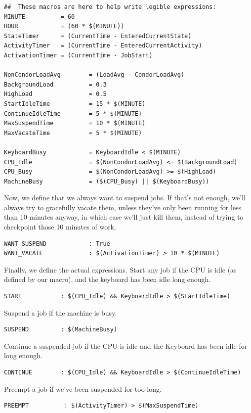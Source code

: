 \begin{verbatim}
##  These macros are here to help write legible expressions:
MINUTE          = 60
HOUR            = (60 * $(MINUTE))
StateTimer      = (CurrentTime - EnteredCurrentState)
ActivityTimer   = (CurrentTime - EnteredCurrentActivity)
ActivationTimer = (CurrentTime - JobStart)

NonCondorLoadAvg        = (LoadAvg - CondorLoadAvg)
BackgroundLoad          = 0.3
HighLoad                = 0.5
StartIdleTime           = 15 * $(MINUTE)
ContinueIdleTime        = 5 * $(MINUTE)
MaxSuspendTime          = 10 * $(MINUTE)
MaxVacateTime           = 5 * $(MINUTE)

KeyboardBusy            = KeyboardIdle < $(MINUTE)
CPU_Idle                = $(NonCondorLoadAvg) <= $(BackgroundLoad)
CPU_Busy                = $(NonCondorLoadAvg) >= $(HighLoad)
MachineBusy             = ($(CPU_Busy) || $(KeyboardBusy))
\end{verbatim}

Now, we define that we always want to suspend jobs.
If that's not enough, we'll always try to gracefully vacate them,
unless they've only been running for less than 10 minutes anyway, in
which case we'll just kill them, instead of trying to checkpoint those
10 minutes of work.
\begin{verbatim}
WANT_SUSPEND            : True
WANT_VACATE             : $(ActivationTimer) > 10 * $(MINUTE)
\end{verbatim}

Finally, we define the actual expressions.  Start any job if the CPU
is idle (as defined by our macro), and the keyboard has been idle long
enough.
\begin{verbatim}
START           : $(CPU_Idle) && KeyboardIdle > $(StartIdleTime)
\end{verbatim}

Suspend a job if the machine is busy.
\begin{verbatim}
SUSPEND         : $(MachineBusy)
\end{verbatim}

Continue a suspended job if the CPU is idle and the Keyboard has been
idle for long enough.
\begin{verbatim}
CONTINUE        : $(CPU_Idle) && KeyboardIdle > $(ContinueIdleTime)
\end{verbatim}

Preempt a job if we've been suspended for too long.
\begin{verbatim}
PREEMPT          : $(ActivityTimer) > $(MaxSuspendTime)
\end{verbatim}

